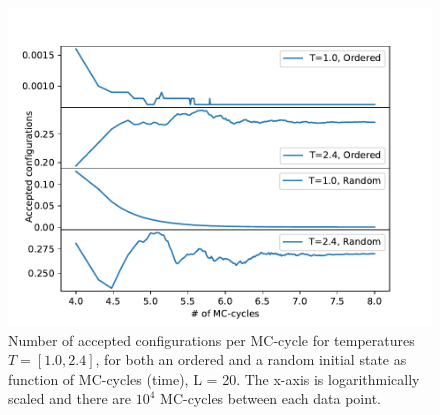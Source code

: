 \documentclass[12pt,english,a4paper]{article}
\begin{document}
\begin{figure}[H]
    \centering
    \includegraphics[scale=0.7]{Figures/Number_of_Accepted_Configs_L_20.pdf}
    \caption{Number of accepted configurations per MC-cycle for temperatures $T=[1.0,2.4]$, for both an ordered and a random initial state as function of MC-cycles (time), L = 20. The x-axis is logarithmically scaled and there are $10^4$ MC-cycles between each data point.}
    \label{fig:acc_conf}
\end{figure}
\end{document}
